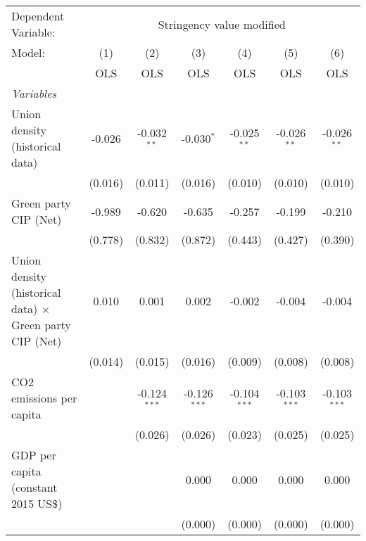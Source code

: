 
\begingroup
\centering
\begin{tabular}{lcccccc}
   \toprule
   Dependent Variable: & \multicolumn{6}{c}{Stringency value modified}\\
   Model:                                                          & (1)     & (2)            & (3)            & (4)            & (5)            & (6)\\  
                                                                   &  OLS    & OLS            & OLS            & OLS            & OLS            & OLS\\  
   \midrule
   \emph{Variables}\\
   Union density (historical data)                                 & -0.026  & -0.032$^{**}$  & -0.030$^{*}$   & -0.025$^{**}$  & -0.026$^{**}$  & -0.026$^{**}$\\   
                                                                   & (0.016) & (0.011)        & (0.016)        & (0.010)        & (0.010)        & (0.010)\\   
   Green party CIP (Net)                                           & -0.989  & -0.620         & -0.635         & -0.257         & -0.199         & -0.210\\   
                                                                   & (0.778) & (0.832)        & (0.872)        & (0.443)        & (0.427)        & (0.390)\\   
   Union density (historical data) $\times$ Green party CIP (Net)  & 0.010   & 0.001          & 0.002          & -0.002         & -0.004         & -0.004\\   
                                                                   & (0.014) & (0.015)        & (0.016)        & (0.009)        & (0.008)        & (0.008)\\   
   CO2 emissions per capita                                        &         & -0.124$^{***}$ & -0.126$^{***}$ & -0.104$^{***}$ & -0.103$^{***}$ & -0.103$^{***}$\\   
                                                                   &         & (0.026)        & (0.026)        & (0.023)        & (0.025)        & (0.025)\\   
   GDP per capita (constant 2015 US\$)                             &         &                & 0.000          & 0.000          & 0.000          & 0.000\\   
                                                                   &         &                & (0.000)        & (0.000)        & (0.000)        & (0.000)\\   

\end{tabular}
